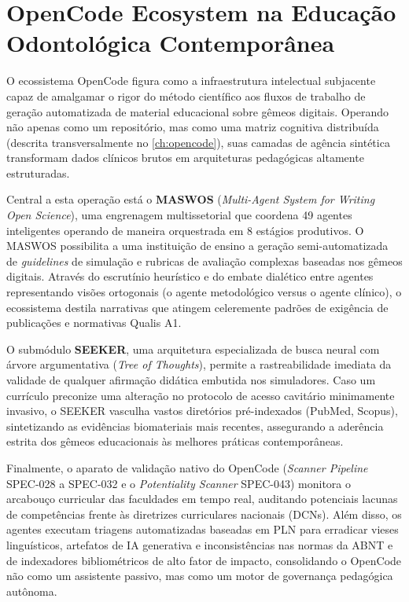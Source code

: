 \section{OpenCode Ecosystem na Educação Odontológica Contemporânea}
\label{sec:opencode-educ}

O ecossistema OpenCode figura como a infraestrutura intelectual subjacente capaz de amalgamar o rigor do método científico aos fluxos de trabalho de geração automatizada de material educacional sobre gêmeos digitais. Operando não apenas como um repositório, mas como uma matriz cognitiva distribuída (descrita transversalmente no \autoref{ch:opencode}), suas camadas de agência sintética transformam dados clínicos brutos em arquiteturas pedagógicas altamente estruturadas.

Central a esta operação está o \textbf{MASWOS} (\textit{Multi-Agent System for Writing Open Science}), uma engrenagem multissetorial que coordena 49 agentes inteligentes operando de maneira orquestrada em 8 estágios produtivos. O MASWOS possibilita a uma instituição de ensino a geração semi-automatizada de \textit{guidelines} de simulação e rubricas de avaliação complexas baseadas nos gêmeos digitais. Através do escrutínio heurístico e do embate dialético entre agentes representando visões ortogonais (o agente metodológico versus o agente clínico), o ecossistema destila narrativas que atingem celeremente padrões de exigência de publicações e normativas Qualis A1.

O submódulo \textbf{SEEKER}, uma arquitetura especializada de busca neural com árvore argumentativa (\textit{Tree of Thoughts}), permite a rastreabilidade imediata da validade de qualquer afirmação didática embutida nos simuladores. Caso um currículo preconize uma alteração no protocolo de acesso cavitário minimamente invasivo, o SEEKER vasculha vastos diretórios pré-indexados (PubMed, Scopus), sintetizando as evidências biomateriais mais recentes, assegurando a aderência estrita dos gêmeos educacionais às melhores práticas contemporâneas.


Finalmente, o aparato de validação nativo do OpenCode (\textit{Scanner Pipeline} SPEC-028 a SPEC-032 e o \textit{Potentiality Scanner} SPEC-043) monitora o arcabouço curricular das faculdades em tempo real, auditando potenciais lacunas de competências frente às diretrizes curriculares nacionais (DCNs). Além disso, os agentes executam triagens automatizadas baseadas em PLN para erradicar vieses linguísticos, artefatos de IA generativa e inconsistências nas normas da ABNT e de indexadores bibliométricos de alto fator de impacto, consolidando o OpenCode não como um assistente passivo, mas como um motor de governança pedagógica autônoma.
